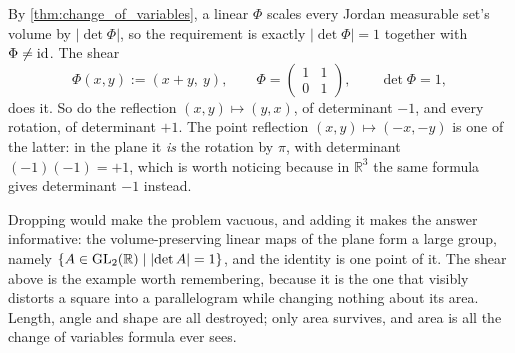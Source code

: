 \begin{exercisesolution}
\label{sol:box_linear_volume_preserving}
By \cref{thm:change_of_variables}, a linear $\Phi$ scales every Jordan measurable set's volume by
$\lvert\det\Phi\rvert$, so the requirement is exactly $\lvert\det\Phi\rvert = 1$ together with
$\Phi \neq \operatorname{id}$. The shear
\[\Phi(x,y) := (x+y,\ y), \qquad
  \Phi = \begin{pmatrix} 1 & 1 \\ 0 & 1\end{pmatrix}, \qquad \det\Phi = 1,\]
does it. So do the reflection $(x,y)\mapsto(y,x)$, of determinant $-1$, and every rotation,
of determinant $+1$. The point reflection $(x,y)\mapsto(-x,-y)$ is one of the latter: in the
plane it \emph{is} the rotation by $\pi$, with determinant $(-1)(-1) = +1$, which is worth
noticing because in $\mathbb{R}^3$ the same formula gives determinant $-1$ instead.
\begin{remark}
Dropping  would make the problem vacuous, and adding it makes the
answer informative: the volume-preserving linear maps of the plane form a large group, namely
$\{A \in \operatorname{GL}_2(\mathbb{R}) \mid \lvert\det A\rvert = 1\}$, and the identity is one point of it. The
shear above is the example worth remembering, because it is the one that visibly distorts a square
into a parallelogram while changing nothing about its area. Length, angle and shape are all
destroyed; only area survives, and area is all the change of variables formula ever sees.
\end{remark}
\end{exercisesolution}

